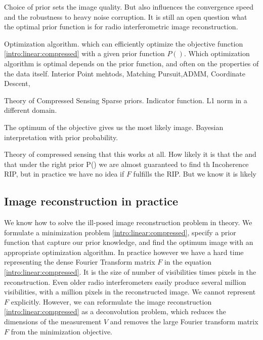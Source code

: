 Choice of prior sets the image quality. But also influences the convergence speed and the robustness to heavy noise corruption. It is still an open question what the optimal prior function is for radio interferometric image reconstruction.


Optimization algorithm. which can efficiently optimize the objective function \eqref{intro:linear:compressed} with a given prior function $P()$. Which optimization algorithm is optimal depends on the prior function, and often on the properties of the data itself.
Interior Point mehtods, Matching Pursuit,ADMM, Coordinate Descent, 

Theory of Compressed Sensing 
Sparse priors. Indicator function. 
L1 norm in a different domain.

The optimum of the objective gives us the most likely image. Bayesian interpretation with prior probability.



Theory of compressed sensing that this works at all. How likely it is that the and that under the right prior P() we are almost guaranteed to find th
Incoherence
RIP, but in practice we have no idea if $F$ fulfills the RIP. But we know it is likely


\subsection{Image reconstruction in practice}\label{intro:major}
We know how to solve the ill-posed image reconstruction problem in theory. We formulate a minimization problem \eqref{intro:linear:compressed}, specify a prior function that capture our prior knowledge, and find the optimum image with an appropriate optimization algorithm. In practice however we have a hard time representing the dense Fourier Transform matrix $F$ in the equation \eqref{intro:linear:compressed}. It is the size of number of visibilities times pixels in the reconstruction. Even older radio interferometers easily produce several million visibilities, with a million pixels in the reconstructed image. We cannot represent $F$ explicitly. However, we can reformulate the image reconstruction \eqref{intro:linear:compressed} as a deconvolution problem, which reduces the dimensions of the measurement $V$ and removes the large Fourier transform matrix $F$ from the minimization objective.

